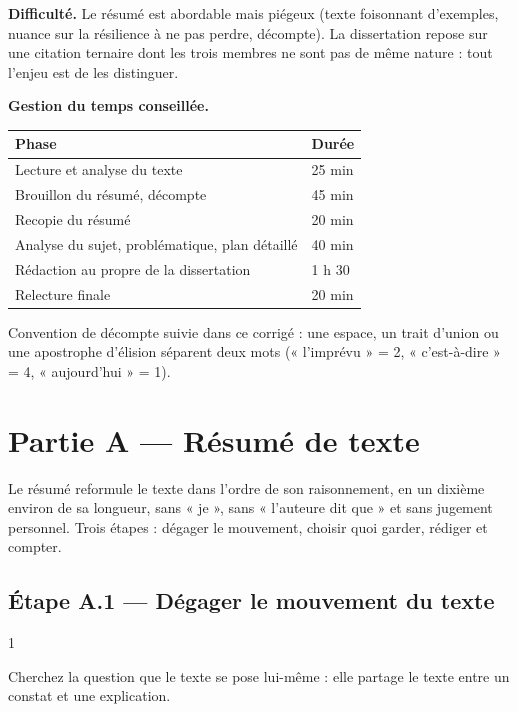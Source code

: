 \documentclass[11pt,a4paper]{article}
\begin{document}
\textbf{Difficulté.} Le résumé est abordable mais piégeux (texte foisonnant d'exemples, nuance sur la résilience à ne pas perdre, décompte). La dissertation repose sur une citation ternaire dont les trois membres ne sont pas de même nature : tout l'enjeu est de les distinguer.

\textbf{Gestion du temps conseillée.}

\begin{longtable}[]{@{}ll@{}}
\toprule\noalign{}
Phase & Durée \\
\midrule\noalign{}
\endhead
\bottomrule\noalign{}
\endlastfoot
Lecture et analyse du texte & 25 min \\
Brouillon du résumé, décompte & 45 min \\
Recopie du résumé & 20 min \\
Analyse du sujet, problématique, plan détaillé & 40 min \\
Rédaction au propre de la dissertation & 1 h 30 \\
Relecture finale & 20 min \\
\end{longtable}

Convention de décompte suivie dans ce corrigé : une espace, un trait d'union ou une apostrophe d'élision séparent deux mots (« l'imprévu » = 2, « c'est-à-dire » = 4, « aujourd'hui » = 1).

\hypertarget{partie-a-ruxe9sumuxe9-de-texte}{%
\section{Partie A --- Résumé de texte}\label{partie-a-ruxe9sumuxe9-de-texte}}

Le résumé reformule le texte dans l'ordre de son raisonnement, en un dixième environ de sa longueur, sans « je », sans « l'auteure dit que » et sans jugement personnel. Trois étapes : dégager le mouvement, choisir quoi garder, rédiger et compter.

\hypertarget{uxe9tape-a.1-duxe9gager-le-mouvement-du-texte}{%
\subsection{Étape A.1 --- Dégager le mouvement du texte}\label{uxe9tape-a.1-duxe9gager-le-mouvement-du-texte}}

\begin{indication}{1}

Cherchez la question que le texte se pose lui-même : elle partage le texte entre un constat et une explication.

\end{indication}
\end{document}

